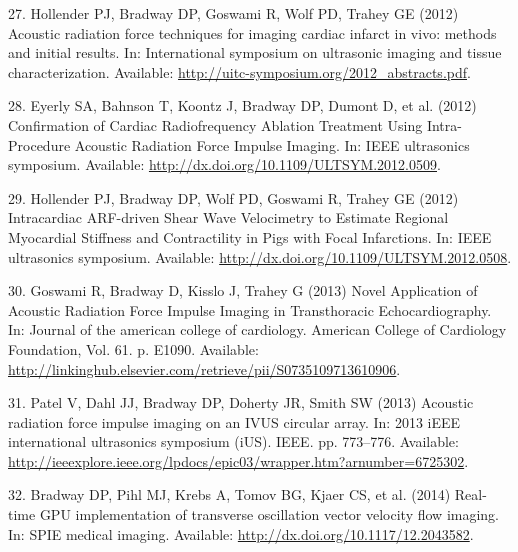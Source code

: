 \documentclass[]{article}
\begin{document}
27. Hollender PJ, Bradway DP, Goswami R, Wolf PD, Trahey GE (2012)
Acoustic radiation force techniques for imaging cardiac infarct in vivo:
methods and initial results. In: International symposium on ultrasonic
imaging and tissue characterization. Available:
\url{http://uitc-symposium.org/2012_abstracts.pdf}.

28. Eyerly SA, Bahnson T, Koontz J, Bradway DP, Dumont D, et al. (2012)
Confirmation of Cardiac Radiofrequency Ablation Treatment Using
Intra-Procedure Acoustic Radiation Force Impulse Imaging. In: IEEE
ultrasonics symposium. Available:
\url{http://dx.doi.org/10.1109/ULTSYM.2012.0509}.

29. Hollender PJ, Bradway DP, Wolf PD, Goswami R, Trahey GE (2012)
Intracardiac ARF-driven Shear Wave Velocimetry to Estimate Regional
Myocardial Stiffness and Contractility in Pigs with Focal Infarctions.
In: IEEE ultrasonics symposium. Available:
\url{http://dx.doi.org/10.1109/ULTSYM.2012.0508}.

30. Goswami R, Bradway D, Kisslo J, Trahey G (2013) Novel Application of
Acoustic Radiation Force Impulse Imaging in Transthoracic
Echocardiography. In: Journal of the american college of cardiology.
American College of Cardiology Foundation, Vol. 61. p. E1090. Available:
\url{http://linkinghub.elsevier.com/retrieve/pii/S0735109713610906}.

31. Patel V, Dahl JJ, Bradway DP, Doherty JR, Smith SW (2013) Acoustic
radiation force impulse imaging on an IVUS circular array. In: 2013 iEEE
international ultrasonics symposium (iUS). IEEE. pp. 773--776.
Available:
\url{http://ieeexplore.ieee.org/lpdocs/epic03/wrapper.htm?arnumber=6725302}.

32. Bradway DP, Pihl MJ, Krebs A, Tomov BG, Kjaer CS, et al. (2014)
Real-time GPU implementation of transverse oscillation vector velocity
flow imaging. In: SPIE medical imaging. Available:
\url{http://dx.doi.org/10.1117/12.2043582}.
\end{document}
